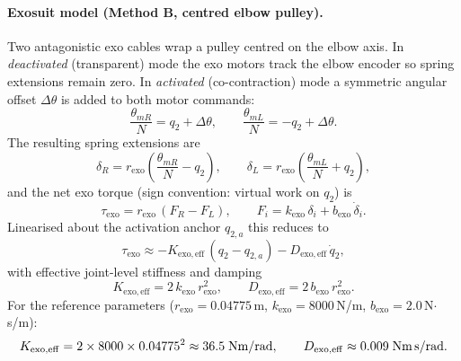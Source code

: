 \documentclass[11pt]{article}
\begin{document}
\paragraph{Exosuit model (Method B, centred elbow pulley).}
Two antagonistic exo cables wrap a pulley centred on the elbow axis.  In \emph{deactivated} (transparent) mode the exo motors track the elbow encoder so spring extensions remain zero.  In \emph{activated} (co-contraction) mode a symmetric angular offset $\Delta\theta$ is added to both motor commands:
\begin{equation}
    \frac{\theta_{mR}}{N} = q_2 + \Delta\theta,\qquad
    \frac{\theta_{mL}}{N} = -q_2 + \Delta\theta.
    \label{eq:exo_motor_cmd}
\end{equation}
The resulting spring extensions are
\begin{equation}
    \delta_R = r_{\mathrm{exo}}\!\left(\frac{\theta_{mR}}{N} - q_2\right),\qquad
    \delta_L = r_{\mathrm{exo}}\!\left(\frac{\theta_{mL}}{N} + q_2\right),
    \label{eq:exo_extensions}
\end{equation}
and the net exo torque (sign convention: virtual work on $q_2$) is
\begin{equation}
    \tau_{\mathrm{exo}} = r_{\mathrm{exo}}\,(F_R - F_L),\qquad
    F_i = k_{\mathrm{exo}}\,\delta_i + b_{\mathrm{exo}}\,\dot{\delta}_i.
    \label{eq:tau_exo_full}
\end{equation}
Linearised about the activation anchor $q_{2,a}$ this reduces to
\begin{equation}
    \tau_{\mathrm{exo}} \approx
    -K_{\mathrm{exo,eff}}\,(q_2 - q_{2,a}) - D_{\mathrm{exo,eff}}\,\dot{q}_2,
    \label{eq:tau_exo_lin}
\end{equation}
with effective joint-level stiffness and damping
\begin{equation}
    K_{\mathrm{exo,eff}} = 2\,k_{\mathrm{exo}}\,r_{\mathrm{exo}}^2,\qquad
    D_{\mathrm{exo,eff}} = 2\,b_{\mathrm{exo}}\,r_{\mathrm{exo}}^2.
    \label{eq:exo_eff}
\end{equation}
For the reference parameters ($r_{\mathrm{exo}} = 0.04775$\,m, $k_{\mathrm{exo}} = 8000$\,N/m, $b_{\mathrm{exo}} = 2.0$\,N$\cdot$s/m):
\begin{equation}
    K_{\mathrm{exo,eff}} = 2\times8000\times0.04775^2 \approx 36.5\;\text{Nm/rad},\qquad
    D_{\mathrm{exo,eff}} \approx 0.009\;\text{Nm\,s/rad}.
    \label{eq:exo_params}
\end{equation}
\end{document}
